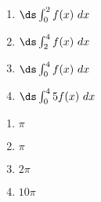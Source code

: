 {\noindent
\begin{minipage}{\linewidth}
\end{minipage}
\begin{enumerate}
\item		$\ds \int_0^2 f(x)\ dx$
\item		$\ds \int_2^4 f(x)\ dx$
\item		$\ds \int_0^4 f(x)\ dx$
\item		$\ds \int_0^4 5f(x)\ dx$
\end{enumerate}

}
{\begin{enumerate}
\item		$\pi$
\item		$\pi$
\item		$2\pi$
\item		$10\pi$
\end{enumerate}
}

